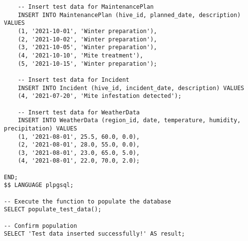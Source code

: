 \documentclass{article}
\begin{document}
\begin{lstlisting}
    -- Insert test data for MaintenancePlan
    INSERT INTO MaintenancePlan (hive_id, planned_date, description) VALUES
    (1, '2021-10-01', 'Winter preparation'),
    (2, '2021-10-02', 'Winter preparation'),
    (3, '2021-10-05', 'Winter preparation'),
    (4, '2021-10-10', 'Mite treatment'),
    (5, '2021-10-15', 'Winter preparation');

    -- Insert test data for Incident
    INSERT INTO Incident (hive_id, incident_date, description) VALUES
    (4, '2021-07-20', 'Mite infestation detected');

    -- Insert test data for WeatherData
    INSERT INTO WeatherData (region_id, date, temperature, humidity, precipitation) VALUES
    (1, '2021-08-01', 25.5, 60.0, 0.0),
    (2, '2021-08-01', 28.0, 55.0, 0.0),
    (3, '2021-08-01', 23.0, 65.0, 5.0),
    (4, '2021-08-01', 22.0, 70.0, 2.0);

END;
$$ LANGUAGE plpgsql;

-- Execute the function to populate the database
SELECT populate_test_data();

-- Confirm population
SELECT 'Test data inserted successfully!' AS result;

\end{lstlisting}
\end{document}
